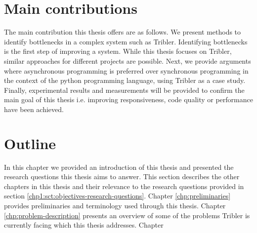 \section{Main contributions}
The main contribution this thesis offers are as follows. We present methods to identify bottlenecks in a complex system such as Tribler. 
Identifying bottlenecks is the first step of improving a system. While this thesis focuses on Tribler, similar approaches for different projects are possible.
Next, we provide arguments where asynchronous programming is preferred over synchronous programming in the context of the python programming language, using Tribler as a case study.
Finally, experimental results and measurements will be provided to confirm the main goal of this thesis i.e. improving responsiveness, code quality or performance have been achieved.

\section{Outline}
In this chapter we provided an introduction of this thesis and presented the research questions this thesis aims to answer. 
This section describes the other chapters in this thesis and their relevance to the research questions provided in section \ref{chp1:sct:objectives-research-questions}.
Chapter \ref{chp:preliminaries} provides preliminaries and terminology used through this thesis.
Chapter \ref{chp:problem-description} presents an overview of some of the problems Tribler is currently facing which this thesis addresses.
Chapter 
